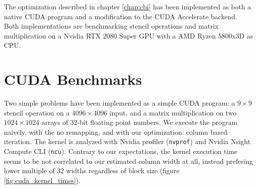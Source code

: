 The optimization described in chapter \ref{chap:cbi} has been implemented as both a native CUDA program and a modification to the CUDA Accelerate backend.
Both implementations are benchmarking stencil operations and matrix multiplication on a Nvidia RTX 2080 Super GPU with a AMD Ryzen 5800x3D as CPU.

\section{CUDA Benchmarks}

Two simple problems have been implemented as a simple CUDA program: a $9 \times 9$ stencil operation on a $4096 \times 4096$ input, and a matrix multiplication on two $1024 \times 1024$ arrays of 32-bit floating point numbers.
We execute the program naively, with the no remapping, and with our optimization: column based iteration.
The kernel is analyzed with Nvidia profiler (\texttt{nvprof}) and Nvidia Nsight Compute CLI (\texttt{ncu}).
Contrary to our expectations, the kernel execution time seems to be not correlated to our estimated column width at all, instead prefering lower multiple of 32 widths regardless of block size (figure \ref{fig:cuda_kernel_times}).


